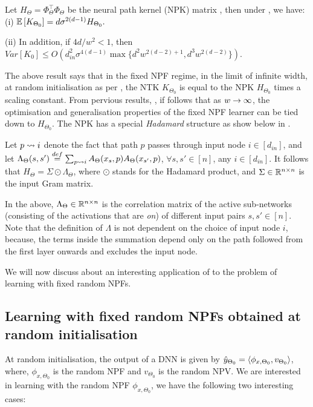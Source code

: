 \begin{theorem}\label{th:main} Let $H_{\Theta}=\Phi^\top_{\Theta}\Phi_{\Theta}$ be the neural path kernel (NPK) matrix , then under , we have:\\
(i) $\mathbb{E}\left[K_{\Theta_0}\right]=d\sigma^{2(d-1)} H_{\Theta_0}.$

(ii) In addition, if ${4d}/{w^2}<1$, then $Var\left[K_0\right]\leq O\left(d^2_{in}\sigma^{4(d-1)}\max\{d^2w^{2(d-2)+1}, d^3w^{2(d-2)}\}\right)$.
\end{theorem}
The above result says that in the fixed NPF regime, in the limit of infinite width, at random initialisation as per , the NTK $K_{\Theta_0}$ is equal to the NPK $H_{\Theta_0}$ times a scaling constant. From pervious results, \cite{arora2019exact,cao2019generalization}, if follows that as $w\rightarrow\infty$, the optimisation and generalisation properties of the fixed NPF learner can be tied down to $H_{\Theta_0}$. The NPK has a special \emph{Hadamard} structure as show below in .
\begin{lemma}\label{lm:npk}
Let $p\rightsquigarrow i$ denote the fact that path $p$ passes through input node $i\in[d_{in}]$, and let $\Lambda_{\Theta}(s,s')\stackrel{def}{=}\sum_{p\rightsquigarrow i} A_{\Theta}(x_s,p) A_{\Theta}(x_{s'},p)$, $\forall s,s'\in[n]$, any $i\in [d_{in}]$. It follows that $H_{\Theta}= \Sigma\odot\Lambda_{\Theta}$, where $\odot$ stands for the Hadamard product, and $\Sigma \in \mathbb{R}^{n\times n}$ is the input Gram matrix.
\end{lemma}
In the  above, $\Lambda_{\Theta}\in\mathbb{R}^{n\times n}$ is the correlation matrix of the active sub-networks (consisting of the activations that are \emph{on}) of different input pairs $s,s'\in[n]$. Note that the definition of $\Lambda$ is not dependent on the choice of input node $i$, because, the terms inside the summation depend only on the path followed from the first layer onwards and excludes the input node.

We will now discuss about an interesting application of  to the problem of learning with fixed random NPFs.
\subsection{Learning with fixed random NPFs obtained at random initialisation}
At random initialisation, the output of a DNN is given by $\hat{y}_{\Theta_0}=\langle \phi_{x,\Theta_0},v_{\Theta_0}\rangle$, where, $\phi_{x,\Theta_0}$ is the random NPF and $v_{\Theta_0}$ is the random NPV. We are interested in learning with the random NPF $\phi_{x,\Theta_{0}}$, we have the following two interesting cases:

